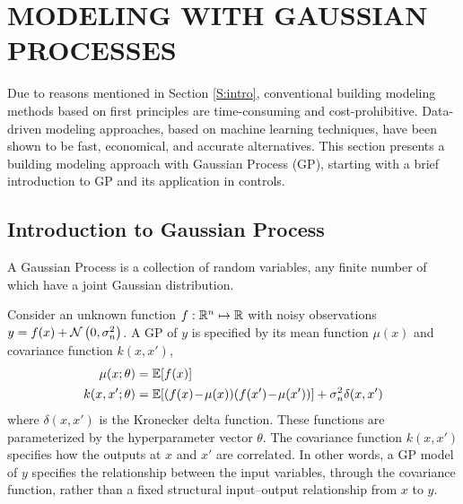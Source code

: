 \section{MODELING WITH GAUSSIAN PROCESSES}
\label{S:gp}

Due to reasons mentioned in Section \ref{S:intro}, conventional building modeling methods based on first principles are time-consuming and cost-prohibitive.
Data-driven modeling approaches, based on machine learning techniques, have been shown to be fast, economical, and accurate alternatives.
This section presents a building modeling approach with Gaussian Process (GP), starting with a brief introduction to GP and its application in controls.
\subsection{Introduction to Gaussian Process}
\label{sec:gp:gp-intro}

\begin{definition}%
A Gaussian Process is a collection of random variables, any finite number of which have a joint Gaussian distribution.
\end{definition}
%
Consider an unknown function \(f: \mathbb{R}^n \mapsto \mathbb{R}\) with noisy observations \(y = f(x) + \operatorname*{\mathcal{N}}\left(0, \sigma_n^2\right)\).
A GP of \(y\) is specified by its mean function \(\mu(x)\) and covariance function \(k(x,x')\),
\begin{align}
\label{E:gp:prior}
\mu(x; \theta) &= \mathbb{E} [f(x)] \\
k(x,x'; \theta) &= \mathbb{E} [(f(x)\!-\!\mu(x)) (f(x') \!-\! \mu(x'))] + \sigma_n^2 \delta(x,x') \nonumber
\end{align}
where \(\delta(x,x')\) is the Kronecker delta function.
These functions are parameterized by the hyperparameter vector \(\theta\).
The covariance function \(k(x,x')\) specifies how the outputs at \(x\) and \(x'\) are correlated.
In other words, a GP model of \(y\) specifies the relationship between the input variables, through the covariance function, rather than a fixed structural input--output relationship from $x$ to $y$.

